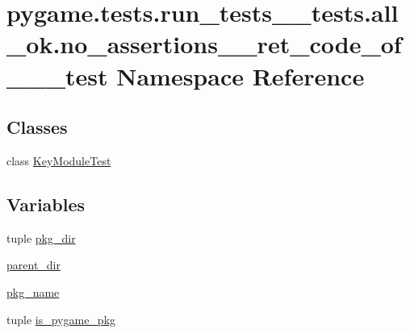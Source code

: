 \hypertarget{namespacepygame_1_1tests_1_1run__tests____tests_1_1all__ok_1_1no__assertions____ret__code__of__1____test}{}\section{pygame.\+tests.\+run\+\_\+tests\+\_\+\+\_\+tests.\+all\+\_\+ok.\+no\+\_\+assertions\+\_\+\+\_\+ret\+\_\+code\+\_\+of\+\_\+\_\+\+\_\+test Namespace Reference}
\label{namespacepygame_1_1tests_1_1run__tests____tests_1_1all__ok_1_1no__assertions____ret__code__of__1____test}
\subsection*{Classes}
\begin{DoxyCompactItemize}
\item 
class \hyperlink{classpygame_1_1tests_1_1run__tests____tests_1_1all__ok_1_1no__assertions____ret__code__of__1____test_1_1_key_module_test}{Key\+Module\+Test}
\end{DoxyCompactItemize}
\subsection*{Variables}
\begin{DoxyCompactItemize}
\item 
tuple \hyperlink{namespacepygame_1_1tests_1_1run__tests____tests_1_1all__ok_1_1no__assertions____ret__code__of__1____test_ad1c1eef77db35ca26ccbc8d51903e52f}{pkg\+\_\+dir}
\item 
\hyperlink{namespacepygame_1_1tests_1_1run__tests____tests_1_1all__ok_1_1no__assertions____ret__code__of__1____test_ae8bbfdd8ede8e64116e3547fb154ffc1}{parent\+\_\+dir}
\item 
\hyperlink{namespacepygame_1_1tests_1_1run__tests____tests_1_1all__ok_1_1no__assertions____ret__code__of__1____test_aa8872dfcf9f7b2ad458ce58b22390ca1}{pkg\+\_\+name}
\item 
tuple \hyperlink{namespacepygame_1_1tests_1_1run__tests____tests_1_1all__ok_1_1no__assertions____ret__code__of__1____test_a201ad343b742c73d53a4e886bb684f91}{is\+\_\+pygame\+\_\+pkg}
\end{DoxyCompactItemize}


